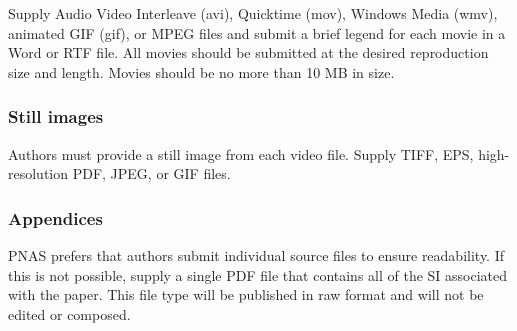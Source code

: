 \documentclass[9pt,twocolumn,twoside]{pnas-new}
\begin{document}
Supply Audio Video Interleave (avi), Quicktime (mov), Windows Media (wmv), animated GIF (gif), or MPEG files and submit a brief legend for each movie in a Word or RTF file. All movies should be submitted at the desired reproduction size and length. Movies should be no more than 10 MB in size. 

\subsubsection*{Still images}

Authors must provide a still image from each video file. Supply TIFF, EPS, high-resolution PDF, JPEG, or GIF files. 

\subsubsection*{Appendices}

PNAS prefers that authors submit individual source files to ensure readability. If this is not possible, supply a single PDF file that contains all of the SI associated with the paper. This file type will be published in raw format and will not be edited or composed.


\showmatmethods %


\showacknow %

\pnasbreak


\end{document}
